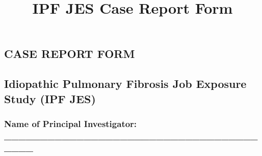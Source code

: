\documentclass[a4paper,10pt]{article}
\begin{document}
 \newpage\title{\bf IPF JES Case Report Form}
 \date{}
 
 
 \pagestyle{fancy}
 
 
 \begin{centering} 
 \section*{CASE REPORT FORM}
 \end{centering}

 \subsection*{Idiopathic Pulmonary Fibrosis Job Exposure Study (IPF JES)}

 \vspace{0.2cm}

 \subsubsection*{Name of Principal Investigator: \_\_\_\_\_\_\_\_\_\_\_\_\_\_\_\_\_\_\_\_\_\_\_\_\_\_\_\_\_\_\_\_\_\_\_\_\_\_\_}

 \vspace{0.6cm}
\end{document}
